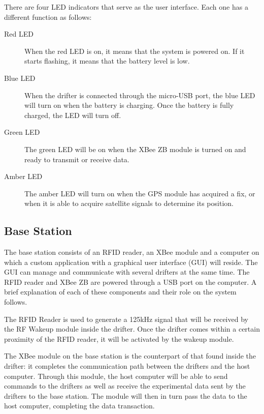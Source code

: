 
There are four LED indicators that serve as the user interface.  Each one has a different function as follows:
\vspace{-12pt}
\begin{description}
\item[Red LED] When the red LED is on, it means that the system is powered on.  If it starts flashing, it means that the battery level is low.

\item[Blue LED] When the drifter is connected through the micro-USB port, the blue LED will turn on when the battery is charging.  Once the battery is fully charged, the LED will turn off.

\item[Green LED] The green LED will be on when the XBee ZB module is turned on and ready to transmit or receive data.

\item[Amber LED] The amber LED will turn on when the GPS module has acquired a fix, or when it is able to acquire satellite signals to determine its position.
\end{description}

\subsection{Base Station}
The base station consists of an RFID reader, an XBee module and a computer on which a custom application with a graphical user interface (GUI) will reside.  The GUI can manage and communicate with several drifters at the same time. The RFID reader and XBee ZB are powered through a USB port on the computer.  A brief explanation of each of these components and their role on the system follows.


The RFID Reader is used to generate a 125kHz signal that will be received by the RF Wakeup module inside the drifter.  Once the drifter comes within a certain proximity of the RFID reader, it will be activated by the wakeup module.


The XBee module on the base station is the counterpart of that found inside the drifter: it completes the communication path between the drifters and the host computer.  Through this module, the host computer will be able to send commands to the drifters as well as receive the experimental data sent by the drifters to the base station.  The module will then in turn pass the data to the host computer, completing the data transaction.

